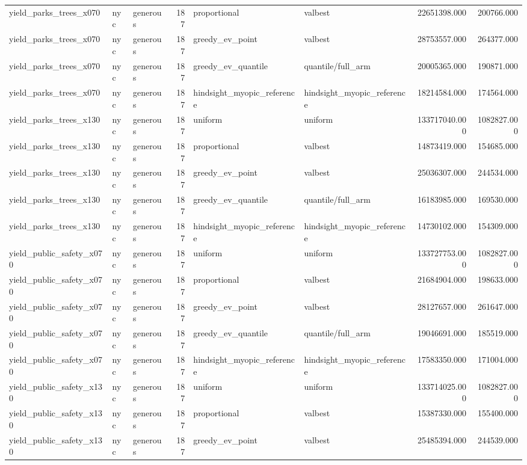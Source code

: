 \begin{tabular}{lllrllrr}
yield\_parks\_trees\_x070 & nyc & generous & 187 & proportional & valbest & 22651398.000 & 200766.000 \\
yield\_parks\_trees\_x070 & nyc & generous & 187 & greedy\_ev\_point & valbest & 28753557.000 & 264377.000 \\
yield\_parks\_trees\_x070 & nyc & generous & 187 & greedy\_ev\_quantile & quantile/full\_arm & 20005365.000 & 190871.000 \\
yield\_parks\_trees\_x070 & nyc & generous & 187 & hindsight\_myopic\_reference & hindsight\_myopic\_reference & 18214584.000 & 174564.000 \\
yield\_parks\_trees\_x130 & nyc & generous & 187 & uniform & uniform & 133717040.000 & 1082827.000 \\
yield\_parks\_trees\_x130 & nyc & generous & 187 & proportional & valbest & 14873419.000 & 154685.000 \\
yield\_parks\_trees\_x130 & nyc & generous & 187 & greedy\_ev\_point & valbest & 25036307.000 & 244534.000 \\
yield\_parks\_trees\_x130 & nyc & generous & 187 & greedy\_ev\_quantile & quantile/full\_arm & 16183985.000 & 169530.000 \\
yield\_parks\_trees\_x130 & nyc & generous & 187 & hindsight\_myopic\_reference & hindsight\_myopic\_reference & 14730102.000 & 154309.000 \\
yield\_public\_safety\_x070 & nyc & generous & 187 & uniform & uniform & 133727753.000 & 1082827.000 \\
yield\_public\_safety\_x070 & nyc & generous & 187 & proportional & valbest & 21684904.000 & 198633.000 \\
yield\_public\_safety\_x070 & nyc & generous & 187 & greedy\_ev\_point & valbest & 28127657.000 & 261647.000 \\
yield\_public\_safety\_x070 & nyc & generous & 187 & greedy\_ev\_quantile & quantile/full\_arm & 19046691.000 & 185519.000 \\
yield\_public\_safety\_x070 & nyc & generous & 187 & hindsight\_myopic\_reference & hindsight\_myopic\_reference & 17583350.000 & 171004.000 \\
yield\_public\_safety\_x130 & nyc & generous & 187 & uniform & uniform & 133714025.000 & 1082827.000 \\
yield\_public\_safety\_x130 & nyc & generous & 187 & proportional & valbest & 15387330.000 & 155400.000 \\
yield\_public\_safety\_x130 & nyc & generous & 187 & greedy\_ev\_point & valbest & 25485394.000 & 244539.000 \\

\end{tabular}
